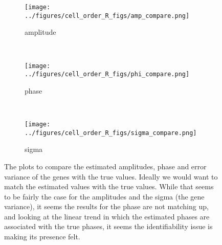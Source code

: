 \documentclass[11pt]{article}
\begin{document}
 \begin{figure*}[ht]
    \centering
     \begin{subfigure}[t]{0.5\textwidth}
        \centering
        \texttt{[image: ../figures/cell\_order\_R\_figs/amp\_compare.png]}
        \caption{amplitude}
    \end{subfigure}%
    ~
    \begin{subfigure}[t]{0.5\textwidth}
        \centering
        \texttt{[image: ../figures/cell\_order\_R\_figs/phi\_compare.png]}
        \caption{phase}
    \end{subfigure}\\

     \begin{subfigure}[t]{0.5\textwidth}
        \centering
        \texttt{[image: ../figures/cell\_order\_R\_figs/sigma\_compare.png]}
        \caption{sigma}
    \end{subfigure}
    \caption{ The plots to compare the estimated amplitudes, phase and error variance of the genes with the true values. Ideally we would want to match the estimated values with the true values. While that seems to be fairly the case for the amplitudes and the sigma (the gene variance), it seems the results for the phase are not matching up, and looking at the linear trend in which the estimated phases are associated with the true phases, it seems the identifiability issue is making its presence felt.}
 \label{fig:fig1}
 \end{figure*}
\end{document}
